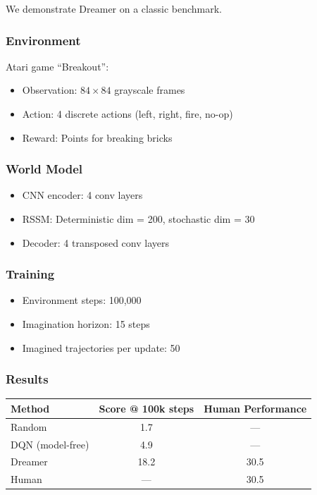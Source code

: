 We demonstrate Dreamer on a classic benchmark.

\subsubsection{Environment}

Atari game ``Breakout'':
\begin{itemize}
    \item Observation: $84 \times 84$ grayscale frames
    \item Action: 4 discrete actions (left, right, fire, no-op)
    \item Reward: Points for breaking bricks
\end{itemize}

\subsubsection{World Model}

\begin{itemize}
    \item CNN encoder: 4 conv layers
    \item RSSM: Deterministic dim = 200, stochastic dim = 30
    \item Decoder: 4 transposed conv layers
\end{itemize}

\subsubsection{Training}

\begin{itemize}
    \item Environment steps: 100,000
    \item Imagination horizon: 15 steps
    \item Imagined trajectories per update: 50
\end{itemize}

\subsubsection{Results}

\begin{center}
\begin{tabular}{lcc}
\toprule
\textbf{Method} & \textbf{Score @ 100k steps} & \textbf{Human Performance} \\
\midrule
Random & 1.7 & --- \\
DQN (model-free) & 4.9 & --- \\
Dreamer & 18.2 & 30.5 \\
Human & --- & 30.5 \\
\bottomrule
\end{tabular}
\end{center}

